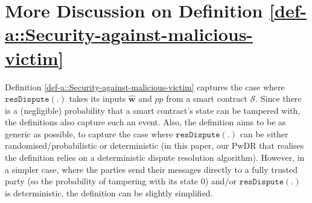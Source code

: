 \vspace{-3mm}
\section{More Discussion on Definition \ref{def-a::Security-against-malicious-victim}}\label{sec::Further-Discussion-on-Definition-Sec-against-victim}
\vspace{-1mm}

Definition  \ref{def-a::Security-against-malicious-victim}
%
 captures the case where $\mathtt{resDispute}(.)$ takes its inputs $\hat{\bm w}$ and  $pp$  from a smart contract $\mathcal{S}$. Since there is a (negligible) probability that a smart contract’s state can be tampered with, the definitions also capture such an event. 
 Also, the definition aims to be as generic as possible, to capture the case where $\mathtt{resDispute}(.)$ can be either randomised/probabilistic or deterministic (in this paper, our PwDR that realises the definition relies on a deterministic dispute resolution algorithm). 
 However, in a simpler case, where the parties send their messages directly to a  fully trusted party (so the probability of tampering with its state $0$) and/or $\mathtt{resDispute}(.)$ is deterministic, the definition can be slightly simplified. 












